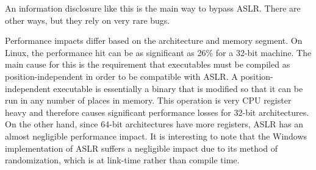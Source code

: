 An information disclosure like this is the main way to bypass ASLR. There are other ways, but they rely on very rare bugs.

Performance impacts differ based on the architecture and memory segment. On Linux, the performance hit can be as significant as 26\% for a 32-bit machine. \cite{payer2012too} The main cause for this is the requirement that executables must be compiled as position-independent in order to be compatible with ASLR. A position-independent executable is essentially a binary that is modified so that it can be run in any number of places in memory. This operation is very CPU register heavy and therefore causes significant performance losses for 32-bit architectures. On the other hand, since 64-bit architectures have more registers, ASLR has an almost negligible performance impact. It is interesting to note that the Windows implementation of ASLR suffers a negligible impact due to its method of randomization, which is at link-time rather than compile time.
